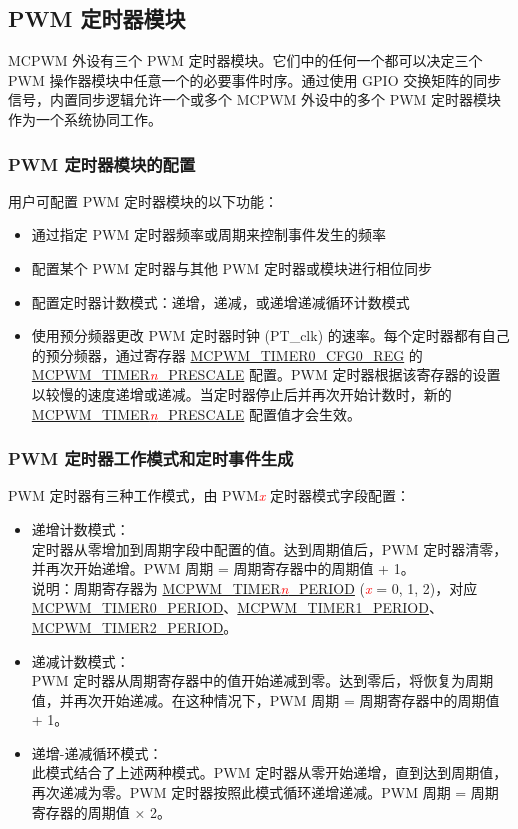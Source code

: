 \documentclass[main\_\_CN.tex]{subfiles}
\begin{document}
\subsection{PWM 定时器模块}
\label{sec:mcpwm-timer-sub}

MCPWM 外设有三个 PWM 定时器模块。它们中的任何一个都可以决定三个 PWM 操作器模块中任意一个的必要事件时序。通过使用 GPIO 交换矩阵的同步信号，内置同步逻辑允许一个或多个 MCPWM 外设中的多个 PWM 定时器模块作为一个系统协同工作。

\subsubsection{PWM 定时器模块的配置 }
用户可配置 PWM 定时器模块的以下功能：
\begin{itemize}
    \item 通过指定 PWM 定时器频率或周期来控制事件发生的频率
    \item 配置某个 PWM 定时器与其他 PWM 定时器或模块进行相位同步
    \item 配置定时器计数模式：递增，递减，或递增递减循环计数模式
    \item 使用预分频器更改 PWM 定时器时钟 (PT\_clk) 的速率。每个定时器都有自己的预分频器，通过寄存器 \hyperref[regdesc:MCPWMTIMERNCFG0REG]{MCPWM\_TIMER0\_CFG0\_REG} 的 \hyperref[fielddesc:MCPWMTIMERNPRESCALE]{MCPWM\_TIMER\textcolor{red}{\it{n}}\_PRESCALE} 配置。PWM 定时器根据该寄存器的设置以较慢的速度递增或递减。当定时器停止后并再次开始计数时，新的\hyperref[fielddesc:MCPWMTIMERNPRESCALE]{MCPWM\_TIMER\textcolor{red}{\it{n}}\_PRESCALE} 配置值才会生效。
\end{itemize}

\subsubsection{PWM 定时器工作模式和定时事件生成}

PWM 定时器有三种工作模式，由 PWM\textcolor{red}{\it{x}} 定时器模式字段配置：

\begin{itemize}
    \item 递增计数模式：\\
    定时器从零增加到周期字段中配置的值。达到周期值后，PWM 定时器清零，并再次开始递增。PWM 周期 = 周期寄存器中的周期值 + 1。\\
    说明：周期寄存器为 \hyperref[fielddesc:MCPWMTIMERNPERIOD]{MCPWM\_TIMER\textcolor{red}{\it{n}}\_PERIOD} (\textcolor{red}{\it{x}} = 0, 1, 2)，对应\\ \hyperref[fielddesc:MCPWMTIMERNPERIOD]{MCPWM\_TIMER0\_PERIOD}、\hyperref[fielddesc:MCPWMTIMERNPERIOD]{MCPWM\_TIMER1\_PERIOD}、\hyperref[fielddesc:MCPWMTIMERNPERIOD]{MCPWM\_TIMER2\_PERIOD}。
    \item 递减计数模式：\\
    PWM 定时器从周期寄存器中的值开始递减到零。达到零后，将恢复为周期值，并再次开始递减。在这种情况下，PWM 周期 = 周期寄存器中的周期值 + 1。
    \item 递增-递减循环模式：\\
    此模式结合了上述两种模式。PWM 定时器从零开始递增，直到达到周期值，再次递减为零。PWM 定时器按照此模式循环递增递减。PWM 周期 = 周期寄存器的周期值 × 2。
\end{itemize}
\end{document}
